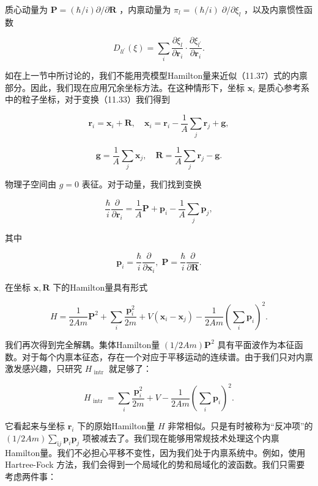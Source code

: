 质心动量为 $\boldsymbol{P}=\left({\hbar/i}\right)\partial/\partial\boldsymbol{R}$
，内禀动量为 ${\pi}_{l}=\left({\hbar/i}\right)\;\partial/\partial{\xi}_{l}$
，以及内禀惯性函数

\[
{D}_{l{l}^{\prime}}\left(\xi\right)=\mathop{\sum}\limits_{i}\frac{\partial{\xi}_{l}}{\partial{\boldsymbol{r}}_{i}}\cdot\frac{\partial{\xi}_{{l}^{\prime}}}{\partial{\boldsymbol{r}}_{i}}.\tag{11.38}
\]

如在上一节中所讨论的，我们不能用壳模型Hamilton量来近似（11.37）式的内禀部分。因此，我们现在应用冗余坐标方法。在这种情形下，坐标
${\boldsymbol{x}}_{i}$ 是质心参考系中的粒子坐标，对于变换（11.33）我们得到

\[
\boldsymbol{r}_{i}=\boldsymbol{x}_{i}+\boldsymbol{R},\quad\boldsymbol{x}_{i}=\boldsymbol{r}_{i}-\frac{1}{A}\sum_{j}\boldsymbol{r}_{j}+\boldsymbol{g},
\]

\[
\boldsymbol{g}=\frac{1}{A}\sum_{j}\boldsymbol{x}_{j},\quad\boldsymbol{R}=\frac{1}{A}\sum_{j}\boldsymbol{r}_{j}-\boldsymbol{g}.\tag{11.39}
\]

物理子空间由 $g=0$ 表征。对于动量，我们找到变换

\[
\frac{\hbar}{i}\frac{\partial}{\partial{\boldsymbol{r}}_{i}}=\frac{1}{A}\boldsymbol{P}+{\boldsymbol{p}}_{i}-\frac{1}{A}\mathop{\sum}\limits_{j}{\boldsymbol{p}}_{j},\tag{11.40}
\]

其中

\[
{\boldsymbol{p}}_{i}=\frac{\hbar}{i}\frac{\partial}{\partial{\boldsymbol{x}}_{i}},\;\boldsymbol{P}=\frac{\hbar}{i}\frac{\partial}{\partial\boldsymbol{R}}.
\]

在坐标 $\boldsymbol{x},\boldsymbol{R}$ 下的Hamilton量具有形式

\[
H=\frac{1}{2Am}{\boldsymbol{P}}^{2}+\mathop{\sum}\limits_{i}\frac{{\boldsymbol{p}}^{2}_{i}}{2m}+V\left({{\boldsymbol{x}}_{i}-{\boldsymbol{x}}_{j}}\right)-\frac{1}{2Am}{\left(\mathop{\sum}\limits_{i}{\boldsymbol{p}}_{i}\right)}^{2}.\tag{11.41}
\]

我们再次得到完全解耦。集体Hamilton量 $\left({1/{2Am}}\right){\boldsymbol{P}}^{2}$
具有平面波作为本征函数。对于每个内禀本征态，存在一个对应于平移运动的连续谱。由于我们只对内禀激发感兴趣，只研究 ${H}_{\text{ intr }}$
就足够了：

\[
{H}_{\text{ intr }}=\mathop{\sum}\limits_{i}\frac{{\boldsymbol{p}}^{2}_{i}}{2m}+V-\frac{1}{2Am}{\left(\mathop{\sum}\limits_{i}{\boldsymbol{p}}_{i}\right)}^{2}.\tag{11.42}
\]

它看起来与坐标 ${\boldsymbol{r}}_{i}$ 下的原始Hamilton量 $H$ 非常相似。只是有时被称为“反冲项”的
$\left({1/{2Am}}\right)\mathop{\sum}\limits_{{\mathrm{i}j}}{\boldsymbol{p}}_{i}{\boldsymbol{p}}_{j}$
项被减去了。我们现在能够用常规技术处理这个内禀Hamilton量。我们不必担心平移不变性，因为我们处于内禀系统中。例如，使用 Hartree-Fock
方法，我们会得到一个局域化的势和局域化的波函数。我们只需要考虑两件事：

